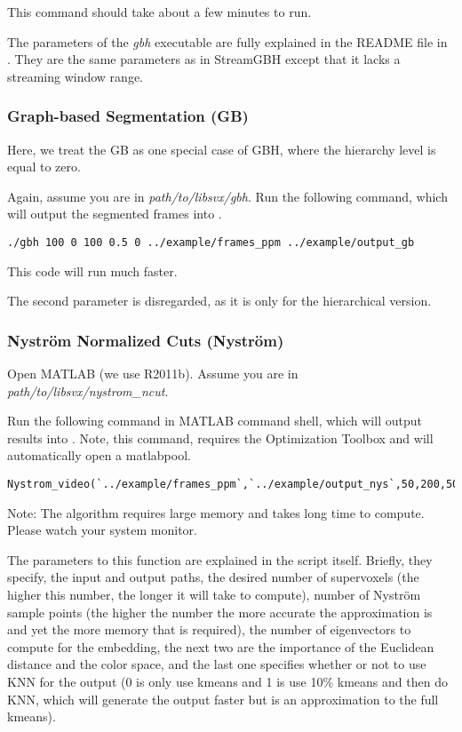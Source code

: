 \documentclass{article}
\begin{document}
This command should take about a few minutes to run.

The parameters of the \textit{gbh} executable are fully explained in the README file in . They are the same parameters as in StreamGBH except that it lacks a streaming window range.

\subsubsection{Graph-based Segmentation (GB)}
\label{sec:gb}
Here, we treat the GB as one special case of GBH, where the hierarchy level is equal to zero. 

Again, assume you are in \textit{path\slash to\slash libsvx\slash gbh}. Run the following command, which will output the segmented frames into .

\begin{verbatim}
./gbh 100 0 100 0.5 0 ../example/frames_ppm ../example/output_gb
\end{verbatim}

This code will run much faster. 

The second parameter is disregarded, as it is only for the hierarchical version.

\subsubsection{Nystr\"{o}m Normalized Cuts (Nystr\"{o}m)}
\label{sec:nystrom}
Open MATLAB (we use R2011b). Assume you are in \textit{path\slash to\slash libsvx\slash nystrom\_ncut}.

Run the following command in MATLAB command shell, which will output results into . Note, this command, requires the Optimization Toolbox and will automatically open a matlabpool. 

\begin{verbatim}
Nystrom_video(`../example/frames_ppm`,`../example/output_nys`,50,200,50,20,20,0)
\end{verbatim}

Note: The algorithm requires large memory and takes long time to compute. Please watch your system monitor.

The parameters to this function are explained in the script itself.  Briefly, they specify, the input and output paths, the desired number of supervoxels (the higher this number, the longer it will take to compute), number of Nystr\"om sample points (the higher the number the more accurate the approximation is and yet the more memory that is required), the number of eigenvectors to compute for the embedding, the next two are the importance of the Euclidean distance and the color space, and the last one specifies whether or not to use KNN for the output (0 is only use kmeans and 1 is use 10\% kmeans and then do KNN, which will generate the output faster but is an approximation to the full kmeans).
\end{document}
